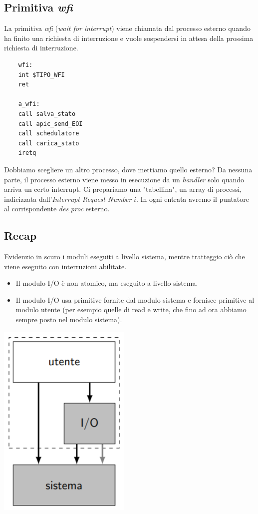 \subsection{Primitiva \emph{wfi}}
La primitiva \emph{wfi} (\emph{wait for interrupt}) viene chiamata dal processo esterno quando ha finito una richiesta di interruzione e vuole sospendersi in attesa della prossima richiesta di interruzione.
\begin{verbatim}
	wfi:
	int $TIPO_WFI
	ret
	
	a_wfi:
	call salva_stato 
	call apic_send_EOI
	call schedulatore
	call carica_stato
	iretq
\end{verbatim}
Dobbiamo scegliere un altro processo, dove mettiamo quello esterno? Da nessuna parte, il processo esterno viene messo in esecuzione da un \textit{handler} solo quando arriva un certo interrupt. Ci prepariamo una "tabellina", un array di processi, indicizzata dall'\emph{Interrupt Request Number} $i$. In ogni entrata avremo il puntatore al corrispondente \emph{des$\_$proc} esterno.



\subsection{Recap} Evidenzio in scuro i moduli eseguiti a livello sistema, mentre tratteggio ciò che viene eseguito con interruzioni abilitate.  
\begin{itemize}
	\item Il modulo I/O è non atomico, ma eseguito a livello sistema.
	\item Il modulo I/O usa primitive fornite dal modulo sistema e fornisce primitive al modulo utente (per esempio quelle di read e write, che fino ad ora abbiamo sempre posto nel modulo sistema). 
\end{itemize}	
\begin{center}
	\includegraphics[scale=.7]{img/280.PNG}
\end{center}
